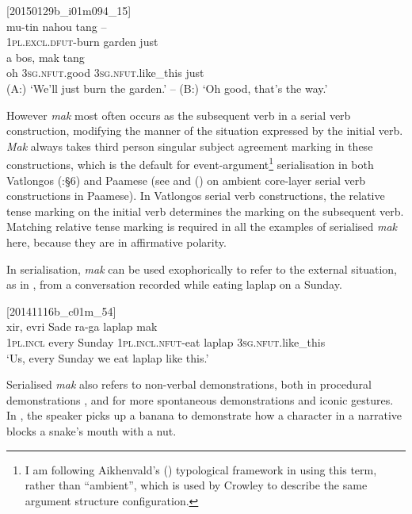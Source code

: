 \documentclass[output=paper,colorlinks,citecolor=brown]{langscibook}
\begin{document}
\ea
{\label{ex:ridge:55}[20150129b\_i01m094\_15]}\\
\gll mu-tin      nahou    tang –\\
     \textsc{1pl.excl.dfut-}burn  garden  just\\
     
\gll a    bos,      mak      tang\\
     oh   \textsc{3sg.nfut.}good   \textsc{3sg.nfut.}like\_this   just\\
\glt (A:) ‘We’ll just burn the garden.’ – (B:) ‘Oh good, that’s the way.’
\z

However \textit{mak} most often occurs as the subsequent verb in a serial verb construction, modifying the manner of the situation expressed by the initial verb. \textit{Mak} always takes third person singular subject agreement marking in these constructions, which is the default for event-argument\footnote{I am following Aikhenvald’s (\citeyear[18-19]{Aikhenvald2006}) typological framework in using this term, rather than “ambient”, which is used by Crowley to describe the same argument structure configuration.} serialisation in both Vatlongos (\citealt{Ridge2019}:§6) and Paamese (see \citet[49]{Crowley1987} and (\citeyear[61]{Crowley2002}) on ambient core-layer serial verb constructions in Paamese). In Vatlongos serial verb constructions, the relative tense marking on the initial verb determines the marking on the subsequent verb. Matching relative tense marking is required in all the examples of serialised \textit{mak} here, because they are in affirmative polarity.

In serialisation, \textit{mak} can be used exophorically to refer to the external situation, as in , from a conversation recorded while eating laplap on a Sunday.

\ea
{\label{ex:ridge:56}[20141116b\_c01m\_54]}\\
\gll xir,  evri  Sade    ra-ga      laplap  mak\\
     \textsc{1pl.incl} every Sunday   \textsc{1pl.incl.nfut}{}-eat   laplap \textsc{3sg.nfut.}like\_this\\
\glt ‘Us, every Sunday we eat laplap like this.’
\z

Serialised \textit{mak} also refers to non-verbal demonstrations, both in procedural demonstrations , and for more spontaneous demonstrations and iconic gestures. In , the speaker picks up a banana to demonstrate how a character in a narrative blocks a snake’s mouth with a nut.
\end{document}
